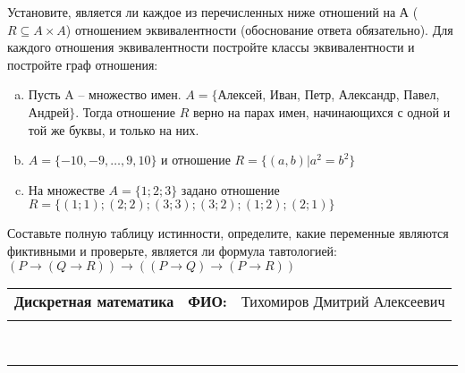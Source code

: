 \documentclass[10pt]{exam}
\newcommand{\class}{Дискретная математика}
\newcommand{\examdate}{}
\begin{document}
\begin{questions}
\question
Установите, является ли каждое из перечисленных ниже отношений на А ($R \subseteq A \times A$) отношением эквивалентности (обоснование ответа обязательно). Для каждого отношения эквивалентности постройте классы 
эквивалентности и постройте граф отношения:
\begin{enumerate} [a)]\setcounter{enumi}{0}
\item Пусть A – множество имен. $A = \{ $Алексей, Иван, Петр, Александр, Павел, Андрей$ \}$. Тогда отношение $R$ верно на парах имен, начинающихся с одной и той же буквы, и только на них.
\item $A = \{-10, -9, … , 9, 10\}$ и отношение $ R = \{(a,b)|a^{2} = b^{2}\}$
\item На множестве $A = \{1; 2; 3\}$ задано отношение $R = \{(1; 1); (2; 2); (3; 3); (3; 2); (1; 2); (2; 1)\}$
\end{enumerate}\question Составьте полную таблицу истинности, определите, какие переменные являются фиктивными и проверьте, является ли формула тавтологией:
$(P \rightarrow (Q \rightarrow R)) \rightarrow ((P \rightarrow Q) \rightarrow (P \rightarrow R))$

\end{questions}
\newpage
\begin{flushright}
\begin{tabular}{p{2.8in} r l}
\textbf{\class} & \textbf{ФИО:} &Тихомиров Дмитрий Алексеевич
\\

\textbf{\examdate} &&\\
\end{tabular}\\
\end{flushright}
\rule[1ex]{\textwidth}{.1pt}
\end{document}
